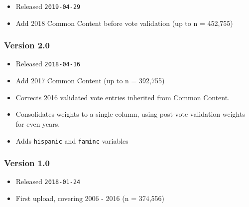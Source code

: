 \documentclass[10pt,article,oneside]{memoir}
\theoremstyle{definition}
\begin{document}
\begin{itemize}
\tightlist
\item
  Released \texttt{2019-04-29}
\item
  Add 2018 Common Content before vote validation (up to n = 452,755)
\end{itemize}

\hypertarget{version-2.0}{%
\subsubsection{Version 2.0}\label{version-2.0}}

\begin{itemize}
\tightlist
\item
  Released \texttt{2018-04-16}
\item
  Add 2017 Common Content (up to n = 392,755)
\item
  Corrects 2016 validated vote entries inherited from Common Content.
\item
  Consolidates weights to a single column, using post-vote validation
  weights for even years.
\item
  Adds \texttt{hispanic} and \texttt{faminc} variables
\end{itemize}

\hypertarget{version-1.0}{%
\subsubsection{Version 1.0}\label{version-1.0}}

\begin{itemize}
\tightlist
\item
  Released \texttt{2018-01-24}
\item
  First upload, covering 2006 - 2016 (n = 374,556)
\end{itemize}
\end{document}

